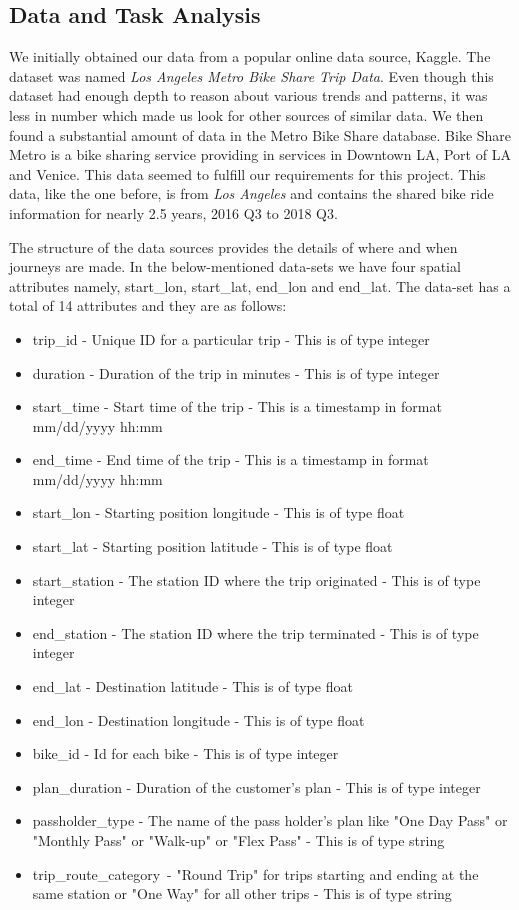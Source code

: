 \subsection{Data and Task Analysis}
\label{sec:data and task abstraction}

We initially obtained our data from a popular online data source, Kaggle. The dataset was named \textit{Los Angeles Metro Bike Share Trip Data}. Even though this dataset had enough depth to reason about various trends and patterns, it was less in number which made us look for other sources of similar data. We then found a substantial amount of data in the Metro Bike Share database. Bike Share Metro is a bike sharing service providing in services in Downtown LA, Port of LA and Venice. This data seemed to fulfill our requirements for this project. This data, like the one before, is from \textit{Los Angeles} and contains the shared bike ride information for nearly 2.5 years, 2016 Q3 to 2018 Q3. 

The structure of the data sources provides the details of where and when journeys are made. In the below-mentioned data-sets we have four spatial attributes namely, start\_lon, start\_lat, end\_lon and end\_lat. The data-set has a total of 14 attributes and they are as follows: 

\begin{itemize}
    \item trip\_id - Unique ID for a particular trip - This is of type integer
    \item duration - Duration of the trip in minutes - This is of type integer
    \item start\_time - Start time of the trip - This is a timestamp in format mm/dd/yyyy hh:mm
    \item end\_time - End time of the trip - This is a timestamp in format mm/dd/yyyy hh:mm
    \item start\_lon - Starting position longitude - This is of type float
    \item start\_lat - Starting position latitude - This is of type float
    \item start\_station - The station ID where the trip originated - This is of type integer
    \item end\_station -  The station ID where the trip terminated - This is of type integer
    \item end\_lat - Destination latitude - This is of type float
    \item end\_lon - Destination longitude - This is of type float
    \item bike\_id - Id for each bike - This is of type integer
    \item plan\_duration - Duration of the customer's plan - This is of type integer
    \item passholder\_type - The name of the pass holder's plan like "One Day Pass" or "Monthly Pass" or "Walk-up" or "Flex Pass" - This is of type string
    \item trip\_route\_category\ -  "Round Trip" for trips starting and ending at the same station or "One Way" for all other trips - This is of type string
\end{itemize}

